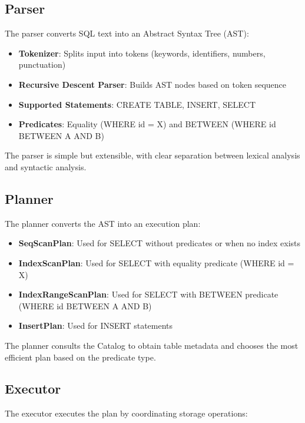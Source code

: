 \documentclass{article}
\begin{document}
\subsection{Parser}

The parser converts SQL text into an Abstract Syntax Tree (AST):

\begin{itemize}
    \item \textbf{Tokenizer}: Splits input into tokens (keywords, identifiers, numbers, punctuation)
    \item \textbf{Recursive Descent Parser}: Builds AST nodes based on token sequence
    \item \textbf{Supported Statements}: CREATE TABLE, INSERT, SELECT
    \item \textbf{Predicates}: Equality (WHERE id = X) and BETWEEN (WHERE id BETWEEN A AND B)
\end{itemize}

The parser is simple but extensible, with clear separation between lexical analysis and syntactic analysis.

\subsection{Planner}

The planner converts the AST into an execution plan:

\begin{itemize}
    \item \textbf{SeqScanPlan}: Used for SELECT without predicates or when no index exists
    \item \textbf{IndexScanPlan}: Used for SELECT with equality predicate (WHERE id = X)
    \item \textbf{IndexRangeScanPlan}: Used for SELECT with BETWEEN predicate (WHERE id BETWEEN A AND B)
    \item \textbf{InsertPlan}: Used for INSERT statements
\end{itemize}

The planner consults the Catalog to obtain table metadata and chooses the most efficient plan based on the predicate type.

\subsection{Executor}

The executor executes the plan by coordinating storage operations:
\end{document}
